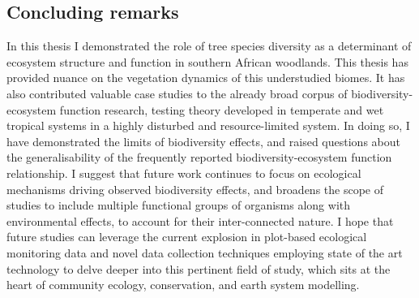 \begin{refsection}

\section{Concluding remarks}
\label{discussion:sec:conclusion}

In this thesis I demonstrated the role of tree species diversity as a determinant of ecosystem structure and function in southern African woodlands. This thesis has provided nuance on the vegetation dynamics of this understudied biomes. It has also contributed valuable case studies to the already broad corpus of biodiversity-ecosystem function research, testing theory developed in temperate and wet tropical systems in a highly disturbed and resource-limited system. In doing so, I have demonstrated the limits of biodiversity effects, and raised questions about the generalisability of the frequently reported biodiversity-ecosystem function relationship. I suggest that future work continues to focus on ecological mechanisms driving observed biodiversity effects, and broadens the scope of studies to include multiple functional groups of organisms along with environmental effects, to account for their inter-connected nature. I hope that future studies can leverage the current explosion in plot-based ecological monitoring data and novel data collection techniques employing state of the art technology to delve deeper into this pertinent field of study, which sits at the heart of community ecology, conservation, and earth system modelling.

\newpage{}
\begingroup
{}
\printbibliography[heading=subbibintoc]
\endgroup

\end{refsection}

